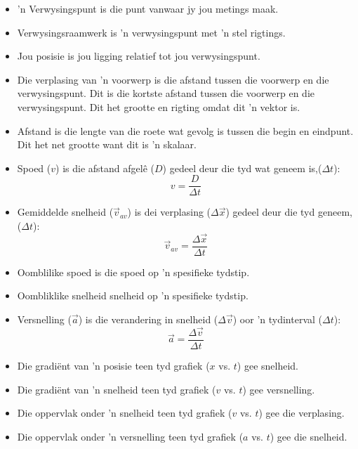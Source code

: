 \summary{}


\begin{itemize}[noitemsep]
    \item 'n Verwysingspunt is die punt vanwaar jy jou metings maak.
    \item Verwysingsraamwerk is 'n verwysingspunt met 'n stel rigtings.
    \item Jou posisie is jou ligging relatief tot jou verwysingspunt.
    \item Die verplasing van 'n voorwerp is die afstand tussen die voorwerp en die verwysingspunt. Dit is die kortste afstand tussen die voorwerp en die verwysingspunt. Dit het grootte en rigting omdat dit 'n vektor is.
    \item Afstand is die lengte van die roete wat gevolg is tussen die begin en eindpunt. Dit het net grootte want dit is 'n skalaar.
    \item Spoed ($v$) is die afstand afgel\^e ($D$) gedeel deur die tyd wat geneem is,($\Delta t$):
        \begin{equation*}
        v=\frac{D}{\Delta t}
        \end{equation*}
    \item Gemiddelde snelheid ($\vec{v}_{av}$) is dei verplasing ($\Delta \vec{x}$) gedeel deur die tyd geneem,($\Delta t$):
        \label{m38796*id80827}\nopagebreak\noindent{}
        \begin{equation*}
        \vec{v}_{av}=\frac{\Delta \vec{x}}{\Delta t}
        \end{equation*}
    \item Oomblilike spoed is die spoed op 'n spesifieke tydstip.
    \item Oombliklike snelheid snelheid op 'n spesifieke tydstip.
    \item Versnelling ($\vec{a}$) is die verandering in snelheid ($\Delta \vec{v}$) oor 'n tydinterval ($\Delta t$):
        \label{m38796*id80925}\nopagebreak\noindent{}
        \begin{equation*}
        \vec{a}=\frac{\Delta \vec{v}}{\Delta t}
        \end{equation*}
    \item Die gradi\"ent van 'n posisie teen tyd grafiek ($x$ vs. $t$) gee snelheid.
    \item Die gradi\"ent van 'n snelheid teen tyd grafiek ($v$ vs. $t$) gee versnelling.
    \item Die oppervlak onder 'n snelheid teen tyd grafiek ($v$ vs. $t$) gee die verplasing.
    \item Die oppervlak onder 'n versnelling teen tyd grafiek ($a$ vs. $t$) gee die snelheid.

\end{itemize}
